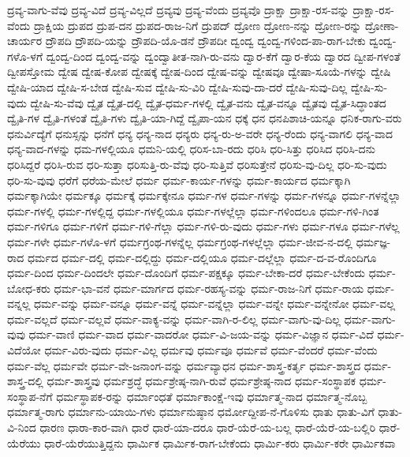 {ದ್ರವ್ಯ-ವಾಗು-ವೆವು
ದ್ರವ್ಯ-ವಿದೆ
ದ್ರವ್ಯ-ವಿಲ್ಲದೆ
ದ್ರವ್ಯವು
ದ್ರವ್ಯ-ವೆಂದು
ದ್ರವ್ಯವೊ
ದ್ರಾಕ್ಷಾ
ದ್ರಾಕ್ಷಾ-ರಸ-ವನ್ನು
ದ್ರಾಕ್ಷಾ-ರಸ-ವೆಂದು
ದ್ರಾಕ್ಷಿಯ
ದ್ರುಪದ
ದ್ರುಪ-ದನ
ದ್ರುಪದ-ರಾಜ-ನಿಗೆ
ದ್ರುಪದ್
ದ್ರೋಣ
ದ್ರೋಣ-ನನ್ನು
ದ್ರೋಣ-ರನ್ನು
ದ್ರೋಣಾ-ಚಾರ್ಯರ
ದ್ರೌಪದಿ
ದ್ರೌಪದಿ-ಯನ್ನು
ದ್ರೌಪದಿ-ಯೊ-ಡನೆ
ದ್ರೌಪದೀ
ದ್ವಂದ್ವ
ದ್ವಂದ್ವ-ಗಳಿಂದ-ಪಾ-ರಾಗ-ಬೇಕು
ದ್ವಂದ್ವ-ಗಳೊ-ಳಗೆ
ದ್ವಂದ್ವ-ದಿಂದ
ದ್ವಂದ್ವ-ವನ್ನು
ದ್ವಂದ್ವಾತೀತ-ನಾಗಿ-ರು-ವನು
ದ್ವಾರ-ಕೆಗೆ
ದ್ವಾರ-ಕೆಯ
ದ್ವಾರದ
ದ್ವೀಪ-ಗಳಂತೆ
ದ್ವೀಪಸ್ತೋಮ
ದ್ವೇಷ
ದ್ವೇಷ-ಕೋಪ
ದ್ವೇಷಕ್ಕೆ
ದ್ವೇಷ-ದಿಂದ
ದ್ವೇಷ-ವನ್ನು
ದ್ವೇಷವೂ
ದ್ವೇಷಾ-ಸೂಯೆ-ಗಳನ್ನು
ದ್ವೇಷಿ
ದ್ವೇಷಿ-ಯಾದ
ದ್ವೇಷಿ-ಸ-ಬೇಡ
ದ್ವೇಷಿ-ಸುವ
ದ್ವೇಷಿ-ಸು-ವಿರಿ
ದ್ವೇಷಿ-ಸುವು-ದಾ-ದರೆ
ದ್ವೇಷಿ-ಸುವು-ದಿಲ್ಲ
ದ್ವೇಷಿ-ಸು-ವುದು
ದ್ವೇಷಿ-ಸು-ವೆವು
ದ್ವೈತ
ದ್ವೈತ-ದಲ್ಲಿ
ದ್ವೈತ-ಧರ್ಮ-ಗಳಲ್ಲಿ
ದ್ವೈತ-ವನು
ದ್ವೈತ-ವನ್ನೂ
ದ್ವೈತವು
ದ್ವೈತ-ಸಿದ್ಧಾಂತದ
ದ್ವೈತಿ-ಗಳ
ದ್ವೈತಿ-ಗಳಂತೆ
ದ್ವೈತಿ-ಗಳು
ದ್ವೈತಿ-ಯಾ-ಗಿದ್ದೆ
ದ್ವೈಪಾ-ಯನ
ಧಕ್ಕೆ
ಧನ
ಧನಪಿಶಾಚಿ-ಯನ್ನೂ
ಧನಿಕ-ರಾಗು-ವರು
ಧನುರ್ವಿದ್ಯೆಗೆ
ಧನುಸ್ಸನ್ನು
ಧನೆಗೆ
ಧನ್ಯ
ಧನ್ಯ-ನಾದ
ಧನ್ಯರು
ಧನ್ಯ-ರು-ಅ-ವರೇ
ಧನ್ಯ-ರೆಂದು
ಧನ್ಯ-ವಾಗಲಿ
ಧನ್ಯ-ವಾದ
ಧನ್ಯ-ವಾದ-ಗಳನ್ನು
ಧಮ-ಗಳಲ್ಲಿಯೂ
ಧಮನಿ-ಯಲ್ಲಿ
ಧರಿಸ-ಬಾ-ರದು
ಧರಿಸಿ
ಧರಿ-ಸಿತ್ತು
ಧರಿಸಿದ
ಧರಿಸಿ-ದನು
ಧರಿಸಿದ್ದರೆ
ಧರಿಸಿ-ರುವ
ಧರಿ-ಸುತ್ತಾ
ಧರಿಸುತ್ತಿ-ರು-ವೆವು
ಧರಿ-ಸುತ್ತಿವೆ
ಧರಿಸುತ್ತೇನೆ
ಧರಿಸು-ವು-ದಿಲ್ಲ
ಧರಿ-ಸು-ವುದು
ಧರಿ-ಸು-ವುವು
ಧರೆಗೆ
ಧರೆಯ-ಮೇಲೆ
ಧರ್ಮ
ಧರ್ಮ-ಕಾರ್ಯ-ಗಳನ್ನು
ಧರ್ಮ-ಕಾರ್ಯದ
ಧರ್ಮಕ್ಕಾಗಿ
ಧರ್ಮಕ್ಕಾಗಿಯೇ
ಧರ್ಮಕ್ಕೂ
ಧರ್ಮಕ್ಕೆ
ಧರ್ಮಕ್ಕೇನೂ
ಧರ್ಮ-ಗಳ
ಧರ್ಮ-ಗಳನ್ನು
ಧರ್ಮ-ಗಳನ್ನೂ
ಧರ್ಮ-ಗಳನ್ನೆಲ್ಲಾ
ಧರ್ಮ-ಗಳಲ್ಲಿ
ಧರ್ಮ-ಗಳಲ್ಲಿದ್ದ
ಧರ್ಮ-ಗಳಲ್ಲಿಯೂ
ಧರ್ಮ-ಗಳಲ್ಲೆಲ್ಲಾ
ಧರ್ಮ-ಗಳಿಂದಲೂ
ಧರ್ಮ-ಗಳಿ-ಗಿಂತ
ಧರ್ಮ-ಗಳಿಗೂ
ಧರ್ಮ-ಗಳಿಗೆ
ಧರ್ಮ-ಗಳಿ-ಗೆಲ್ಲಾ
ಧರ್ಮ-ಗಳಿ-ರು-ವುದು
ಧರ್ಮ-ಗಳು
ಧರ್ಮ-ಗಳೂ
ಧರ್ಮ-ಗಳೆಲ್ಲ
ಧರ್ಮ-ಗಳೇ
ಧರ್ಮ-ಗಳೊ-ಳಗೆ
ಧರ್ಮಗ್ರಂಥ-ಗಳನ್ನೆಲ್ಲ
ಧರ್ಮಗ್ರಂಥ-ಗಳಲ್ಲೆಲ್ಲಾ
ಧರ್ಮ-ಜೀವ-ನ-ದಲ್ಲಿ
ಧರ್ಮಜ್ಞ-ರಾದ
ಧರ್ಮದ
ಧರ್ಮ-ದಲ್ಲಿ
ಧರ್ಮ-ದಲ್ಲಿದ್ದು
ಧರ್ಮ-ದಲ್ಲಿಯೂ
ಧರ್ಮ-ದಲ್ಲೆಲ್ಲಾ
ಧರ್ಮ-ದ-ವ-ರೊಂದಿಗೂ
ಧರ್ಮ-ದಿಂದ
ಧರ್ಮ-ದಿಂದಲೇ
ಧರ್ಮ-ದೊಂದಿಗೆ
ಧರ್ಮ-ಪಕ್ಷಕ್ಕೂ
ಧರ್ಮ-ಬೇಕಾ-ದರೆ
ಧರ್ಮ-ಬೇಕೆಂದು
ಧರ್ಮ-ಬೋಧ-ಕರು
ಧರ್ಮ-ಭಾ-ವನೆ
ಧರ್ಮ-ಮಾರ್ಗದ
ಧರ್ಮ-ರಹಸ್ಯ-ವನ್ನು
ಧರ್ಮ-ರಾಜ-ನಿಗೆ
ಧರ್ಮ-ರಾಯ
ಧರ್ಮ-ವನ್ನಲ್ಲ
ಧರ್ಮ-ವನ್ನು
ಧರ್ಮ-ವನ್ನೂ
ಧರ್ಮ-ವನ್ನೆ
ಧರ್ಮ-ವನ್ನೆಲ್ಲಾ
ಧರ್ಮ-ವನ್ನೇ
ಧರ್ಮ-ವನ್ನೇನೋ
ಧರ್ಮ-ವಲ್ಲ
ಧರ್ಮ-ವಲ್ಲದೆ
ಧರ್ಮ-ವಲ್ಲವೆ
ಧರ್ಮ-ವಾಕ್ಯ-ವನ್ನು
ಧರ್ಮ-ವಾಗಿ-ರ-ಲಿಲ್ಲ
ಧರ್ಮ-ವಾಗು-ವು-ದಿಲ್ಲ
ಧರ್ಮ-ವಾಗು-ವುವು
ಧರ್ಮ-ವಾಣಿ
ಧರ್ಮ-ವಾದ
ಧರ್ಮ-ವಾದರೋ
ಧರ್ಮ-ವಿ-ಜಯ-ವನ್ನು
ಧರ್ಮ-ವಿಜ್ಞಾನ
ಧರ್ಮ-ವಿದೆ
ಧರ್ಮ-ವಿದೆಯೋ
ಧರ್ಮ-ವಿರು-ವುದು
ಧರ್ಮ-ವಿಲ್ಲ
ಧರ್ಮವು
ಧರ್ಮವೂ
ಧರ್ಮವೆ
ಧರ್ಮ-ವೆಂದರೆ
ಧರ್ಮ-ವೆಂದು
ಧರ್ಮ-ವೆಲ್ಲ
ಧರ್ಮವೇ
ಧರ್ಮ-ವೇ-ಜನಾಂಗ-ವನ್ನು
ಧರ್ಮವ್ಯಾಧನ
ಧರ್ಮ-ಶಾಸ್ತ್ರ-ಕರ್ತೃ
ಧರ್ಮ-ಶಾಸ್ತ್ರದ
ಧರ್ಮ-ಶಾಸ್ತ್ರ-ದಲ್ಲಿ
ಧರ್ಮ-ಶಾಸ್ತ್ರವು
ಧರ್ಮಶ್ರದ್ಧೆ
ಧರ್ಮಶ್ರೇಷ್ಠ-ನಾಗಿ-ರುವೆ
ಧರ್ಮಶ್ರೇಷ್ಠ-ನಾದ
ಧರ್ಮ-ಸಂಸ್ಥಾಪಕ
ಧರ್ಮ-ಸಂಸ್ಥಾಪ-ನೆಗೆ
ಧರ್ಮಸ್ಥಾಪಕ-ರನ್ನು
ಧರ್ಮಾಂಧತೆ
ಧರ್ಮಾಕಾಂಕ್ಷೆ-ಇವು
ಧರ್ಮಾತ್ಮ-ನಾದ
ಧರ್ಮಾತ್ಮ-ನೊಬ್ಬ
ಧರ್ಮಾತ್ಮ-ರಾಗು
ಧರ್ಮಾನು-ಯಾಯಿ-ಗಳು
ಧರ್ಮಾನುಷ್ಠಾನ
ಧರ್ಮೋದ್ದೀಪ-ನೆ-ಗೊಳಿಸು
ಧಾತು
ಧಾತು-ವಿಗೆ
ಧಾತು-ವಿ-ನಿಂದ
ಧಾರಣ
ಧಾರಾ-ಕಾರ-ವಾಗಿ
ಧಾರೆ
ಧಾರೆ-ಯಾ-ದರೂ
ಧಾರೆ-ಯೆರೆ-ಯ-ಬಲ್ಲ
ಧಾರೆ-ಯೆರೆ-ಯ-ಬಲ್ಲಿರಿ
ಧಾರೆ-ಯೆರೆಯು
ಧಾರೆ-ಯೆರೆಯುತ್ತಿದ್ದನು
ಧಾರ್ಮಿಕ
ಧಾರ್ಮಿಕ-ರಾಗ-ಬೇಕೆಂದು
ಧಾರ್ಮಿ-ಕರು
ಧಾರ್ಮಿ-ಕರೇ
ಧಾರ್ಮಿಕವಾ
}
